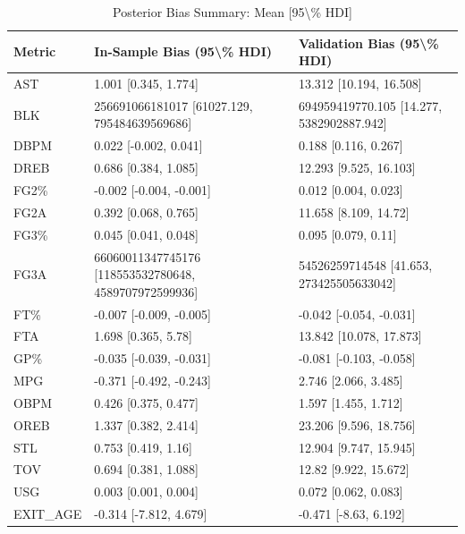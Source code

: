 \begin{table}[t]
\caption*{
{\fontsize{20}{25}\selectfont  Posterior Bias Summary: Mean [95\textbackslash{}\% HDI]\fontsize{12}{15}\selectfont }
} 
\fontsize{12.0pt}{14.0pt}\selectfont
\begin{tabular*}{\linewidth}{@{\extracolsep{\fill}}lll}
\toprule
Metric & In-Sample Bias (95\textbackslash{}\% HDI) & Validation Bias (95\textbackslash{}\% HDI) \\ 
\midrule\addlinespace[2.5pt]
AST & 1.001 [0.345, 1.774] & 13.312 [10.194, 16.508] \\ 
BLK & 256691066181017 [61027.129, 795484639569686] & 694959419770.105 [14.277, 5382902887.942] \\ 
DBPM & 0.022 [-0.002, 0.041] & 0.188 [0.116, 0.267] \\ 
DREB & 0.686 [0.384, 1.085] & 12.293 [9.525, 16.103] \\ 
FG2\% & -0.002 [-0.004, -0.001] & 0.012 [0.004, 0.023] \\ 
FG2A & 0.392 [0.068, 0.765] & 11.658 [8.109, 14.72] \\ 
FG3\% & 0.045 [0.041, 0.048] & 0.095 [0.079, 0.11] \\ 
FG3A & 66060011347745176 [118553532780648, 4589707972599936] & 54526259714548 [41.653, 273425505633042] \\ 
FT\% & -0.007 [-0.009, -0.005] & -0.042 [-0.054, -0.031] \\ 
FTA & 1.698 [0.365, 5.78] & 13.842 [10.078, 17.873] \\ 
GP\% & -0.035 [-0.039, -0.031] & -0.081 [-0.103, -0.058] \\ 
MPG & -0.371 [-0.492, -0.243] & 2.746 [2.066, 3.485] \\ 
OBPM & 0.426 [0.375, 0.477] & 1.597 [1.455, 1.712] \\ 
OREB & 1.337 [0.382, 2.414] & 23.206 [9.596, 18.756] \\ 
STL & 0.753 [0.419, 1.16] & 12.904 [9.747, 15.945] \\ 
TOV & 0.694 [0.381, 1.088] & 12.82 [9.922, 15.672] \\ 
USG & 0.003 [0.001, 0.004] & 0.072 [0.062, 0.083] \\ 
EXIT\_AGE & -0.314 [-7.812, 4.679] & -0.471 [-8.63, 6.192] \\ 
\bottomrule
\end{tabular*}
\end{table}

